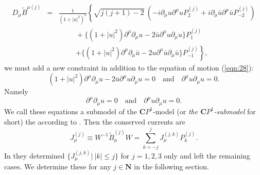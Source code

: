 \documentclass[makeidx,12pt,openany]{report}
\begin{document}
\begin{eqnarray}
 D_{\mu}\tilde{B}^{\mu (j)} &=& \frac{1}{(1+|u|^2)^2}
     \left\{ \sqrt{j(j+1)-2} \ 
      (-i\partial_{\mu}u\partial^{\mu}u P_2^{(j)}
       +i\partial_{\mu}\bar{u}\partial^{\mu}\bar{u} P_{-2}^{(j)}) 
     \right. \nonumber\\
  && \hspace{1cm}
     +\{(1+|u|^2)\partial^{\mu}\partial_{\mu}u
        -2\bar{u}\partial^{\mu}u\partial_{\mu}u \} P_1^{(j)} \nonumber\\
  && \hspace{1cm}
     \left.
     +\{(1+|u|^2)\partial^{\mu}\partial_{\mu}\bar{u}
        -2u\partial^{\mu}\bar{u}\partial_{\mu}\bar{u} \} P_{-1}^{(j)}
     \right\} ,
\end{eqnarray}
we must add a new constraint in addition to the equation of motion 
(\ref{eqn:28}):
$$ (1+|u|^2)\partial^{\mu}\partial_{\mu}u
        -2\bar{u}\partial^{\mu}u\partial_{\mu}u =0 \quad 
\mbox{and} \quad
 \partial^{\mu}u\partial_{\mu}u=0. $$
Namely
\begin{equation}
 \partial^{\mu}\partial_{\mu}u=0 \quad \mbox{and} \quad 
 \partial^{\mu}u\partial_{\mu}u=0. 
\end{equation}
We call these equations a submodel of the $\mathbf{C}P^1$-model 
(or \textit{the $\mathbf{C}P^1$-submodel} for short) the according to 
\cite{AFG1}. 
Then the conserved currents are 
\begin{equation}
 J_{\mu}^{(j)} \equiv W^{-1} \tilde{B}_{\mu}^{(j)} W
   =\sum_{k=-j}^{j} J_{\mu}^{(j,k)}P_k^{(j)}. 
  \label{eqn:cons-curr-AFG}
\end{equation}
In \cite{AFG1} they determined $\{ J_{\mu}^{(j,k)} | \ |k| \le j \}$ 
for $j=1,2,3$ only and left the remaining cases. 
We determine these for any $j \in \mathbf{N}$ in the following section. 
\end{document}
